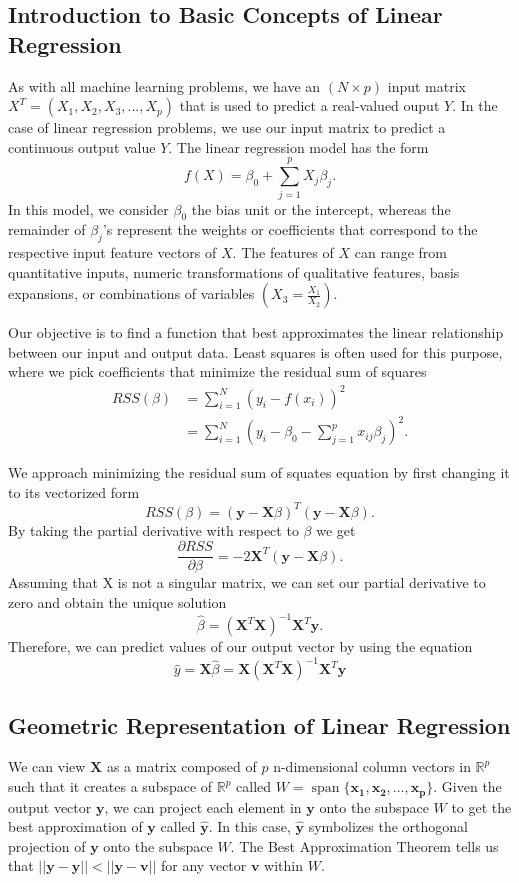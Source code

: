 \documentclass[11pt, letterpaper]{article}
\DeclareMathOperator{\spn}{span}
\renewcommand{\vec}[1]{\mathbf{#1}}
\begin{document}
\subsection{Introduction to Basic Concepts of Linear Regression}
As with all machine learning problems, we have an $(N \times p)$ input matrix $X^T = (X_1, X_2, X_3,...,X_p)$ that is used to predict a real-valued ouput $Y$. In the case of linear regression problems, we use our input matrix to predict a continuous output value $Y$. The linear regression model has the form $$f(X) = \beta_0 + \sum_{j=1}^{p} X_j\beta_j.$$ In this model, we consider $\beta_0$ the bias unit or the intercept, whereas the remainder of $\beta_j$'s represent the weights or coefficients that correspond to the respective input feature vectors of $X$. The features of $X$ can range from quantitative inputs, numeric transformations of qualitative  features, basis expansions, or combinations of variables $(X_3 = \displaystyle \frac {X_1} {X_2})$.

Our objective is to find a function that best approximates the linear relationship between our input and output data. Least squares is often used for this purpose, where we pick coefficients that minimize the residual sum of squares 
\begin{align}
RSS(\beta) &= \sum_{i=1}^{N} (y_i - f(x_i))^2 \\
&= \sum_{i=1}^{N}(y_i - \beta_0 - \sum_{j=1}^{p}x_{ij}\beta_j)^2.
\end{align}

We approach minimizing the residual sum of squates equation by first changing it to its vectorized form $$RSS(\beta) = (\vec{y} - \mathbf{X} \beta)^T(\vec{y} - \mathbf{X} \beta).$$
By taking the partial derivative with respect to $\beta$ we get $$\frac {\partial RSS}{\partial \beta} = -2\mathbf{X}^T(\vec{y} - \mathbf{X} \beta).$$ Assuming that X is not a singular matrix, we can set our partial derivative to zero and obtain the unique solution $$\hat{\beta} = (\mathbf{X}^T \mathbf{X})^{-1} \mathbf{X}^T\vec{y}.$$
Therefore, we can predict values of our output vector by using the equation $$\hat{y} = \mathbf{X} \hat{\beta} = \mathbf{X}  (\mathbf{X}^T \mathbf{X})^{-1}  \mathbf{X}^T\vec{y}$$

\subsection{Geometric Representation of Linear Regression}

We can view $\textbf{X}$ as a matrix composed of $p$ n-dimensional column vectors in $\mathbb{R}^p$ such that it creates a subspace of $\mathbb{R}^p$ called $W = \spn\{\vec{x_1}, \vec{x_2},...,\vec{x_p}\}$. Given the output vector $\vec{y}$, we can project each element in $\vec{y}$ onto the subspace $W$ to get the best approximation of $\vec{y}$ called $\hat{\vec{y}}$. In this case, $\hat{\vec{y}}$ symbolizes the orthogonal projection of $\vec{y}$ onto the subspace $W$. The Best Approximation Theorem tells us that  $|| \vec{y} - \hat{\vec{y}}|| < || \vec{y} - \vec{v}||$ for any vector $\vec{v}$ within $W$.
\end{document}

